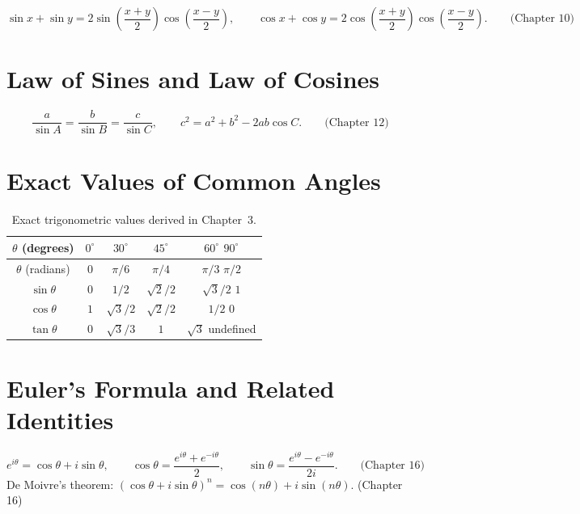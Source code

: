 \[
\sin x + \sin y = 2\sin\left(\frac{x+y}{2}\right)\cos\left(\frac{x-y}{2}\right),
\qquad
\cos x + \cos y = 2\cos\left(\frac{x+y}{2}\right)\cos\left(\frac{x-y}{2}\right).
\qquad \text{(Chapter 10)}
\]

\section{Law of Sines and Law of Cosines}

\[
\frac{a}{\sin A} = \frac{b}{\sin B} = \frac{c}{\sin C}, \qquad
c^2 = a^2+b^2-2ab\cos C. \qquad \text{(Chapter 12)}
\]

\section{Exact Values of Common Angles}

\begin{table}[h]
\centering
\begin{tabular}{ccccc}
\toprule
$\theta$ (degrees) & $0^\circ$ & $30^\circ$ & $45^\circ$ & $60^\circ$
\quad $90^\circ$ \\
\midrule
$\theta$ (radians) & $0$ & $\pi/6$ & $\pi/4$ & $\pi/3$ \quad $\pi/2$ \\
$\sin\theta$ & $0$ & $1/2$ & $\sqrt2/2$ & $\sqrt3/2$ \quad $1$ \\
$\cos\theta$ & $1$ & $\sqrt3/2$ & $\sqrt2/2$ & $1/2$ \quad $0$ \\
$\tan\theta$ & $0$ & $\sqrt3/3$ & $1$ & $\sqrt3$ \quad undefined \\
\bottomrule
\end{tabular}
\caption{Exact trigonometric values derived in Chapter~3.}
\end{table}

\section{Euler's Formula and Related Identities}

\[
e^{i\theta} = \cos\theta + i\sin\theta, \qquad
\cos\theta = \frac{e^{i\theta}+e^{-i\theta}}{2}, \qquad
\sin\theta = \frac{e^{i\theta}-e^{-i\theta}}{2i}. \qquad \text{(Chapter
16)}
\]
De Moivre's theorem: $(\cos\theta+i\sin\theta)^n = \cos(n\theta) +
i\sin(n\theta)$. \quad (Chapter 16)
